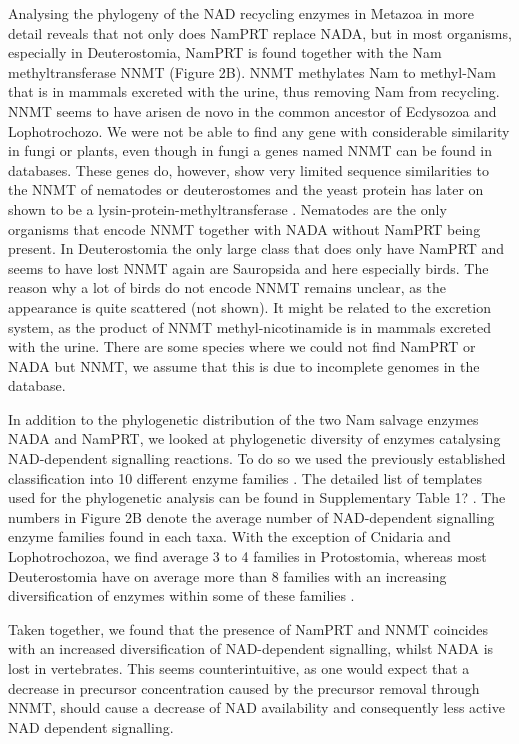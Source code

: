 Analysing the phylogeny of the NAD recycling enzymes in Metazoa in more detail reveals that not only does NamPRT replace NADA, but in most organisms, especially in Deuterostomia, NamPRT is found together with the Nam methyltransferase NNMT (Figure 2B). NNMT methylates Nam to methyl-Nam that is in mammals excreted with the urine, thus removing Nam from recycling. NNMT seems to have arisen de novo in the common ancestor of Ecdysozoa and Lophotrochozo.  We were not be able to find any gene with considerable similarity in fungi or plants, even though in fungi a genes named NNMT can be found in databases. These genes do, however, show very limited sequence similarities to the NNMT of nematodes or deuterostomes and the yeast protein has later on shown to be a lysin-protein-methyltransferase \cite{Wlodarski2011}. Nematodes are the only organisms that encode NNMT together with NADA without NamPRT being present. In Deuterostomia the only large class that does only have NamPRT and seems to have lost NNMT again are Sauropsida and here especially birds. The reason why a lot of birds do not encode NNMT remains unclear, as the appearance is quite scattered (not shown). It might be related to the excretion system, as the product of NNMT methyl-nicotinamide is in mammals excreted with the urine. There are some species where we could not find NamPRT or NADA but NNMT, we assume that this is due to incomplete genomes in the database.

In addition to the phylogenetic distribution of the two Nam salvage enzymes NADA and NamPRT, we looked at phylogenetic diversity of enzymes catalysing NAD-dependent signalling reactions. To do so we used the previously established classification into 10 different enzyme families \cite{Gossmann2012FEBS}. The detailed list of templates used for the phylogenetic analysis can be found in  Supplementary Table 1? . The numbers in Figure 2B denote the average number of NAD-dependent signalling enzyme families found in each taxa. With the exception of Cnidaria and Lophotrochozoa, we find average 3 to 4 families in Protostomia, whereas most Deuterostomia have on average more than 8 families with an increasing diversification of enzymes within some of these families \cite{Gossmann2014DNAR}.

Taken together, we found that the presence of NamPRT and NNMT coincides with an increased diversification of NAD-dependent signalling, whilst NADA is lost in vertebrates. This seems  counterintuitive, as one would expect that a decrease in precursor concentration caused by the precursor removal through NNMT, should cause a decrease of NAD availability and consequently less active NAD dependent signalling.


